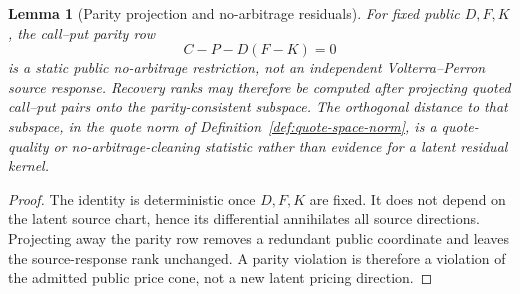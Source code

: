 \documentclass[11pt,a4paper]{amsart}
\theoremstyle{plain}
\newtheorem{lemma}[theorem]{Lemma}
\theoremstyle{definition}
\theoremstyle{remark}
\begin{document}
\begin{lemma}[Parity projection and no-arbitrage residuals]\label{lem:parity-projection}
For fixed public \(D,F,K\), the call--put parity row
\[
        C-P-D(F-K)=0
\]
is a static public no-arbitrage restriction, not an independent Volterra--Perron source
response.  Recovery ranks may therefore be computed after projecting quoted call--put pairs onto
the parity-consistent subspace.  The orthogonal distance to that subspace, in the quote norm of
Definition~\ref{def:quote-space-norm}, is a quote-quality or no-arbitrage-cleaning statistic
rather than evidence for a latent residual kernel.
\end{lemma}

\begin{proof}
The identity is deterministic once \(D,F,K\) are fixed.  It does not depend on the latent source
chart, hence its differential annihilates all source directions.  Projecting away the parity row
removes a redundant public coordinate and leaves the source-response rank unchanged.  A parity
violation is therefore a violation of the admitted public price cone, not a new latent pricing
direction.
\end{proof}
\end{document}

